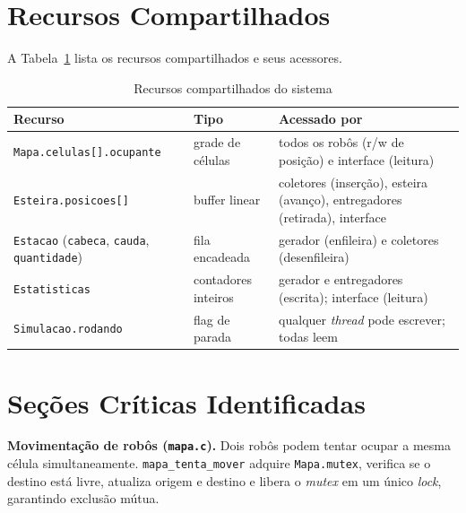 \documentclass[12pt]{article}
\begin{document}
\section{Recursos Compartilhados}
\label{sec:recursos}

A Tabela~\ref{tab:recursos} lista os recursos compartilhados e seus acessores.

\begin{table}[ht]
\centering
\caption{Recursos compartilhados do sistema}
\label{tab:recursos}
\footnotesize
\begin{tabular}{>{\raggedright\arraybackslash}p{4.1cm}
                >{\raggedright\arraybackslash}p{2.4cm}
                >{\raggedright\arraybackslash}p{6.6cm}}
\toprule
\textbf{Recurso} & \textbf{Tipo} & \textbf{Acessado por} \\
\midrule
\texttt{Mapa.celulas[]}\allowbreak\texttt{.ocupante} &
  grade de células &
  todos os robôs (r/w de posição) e interface (leitura) \\
\addlinespace
\texttt{Esteira.posicoes[]} &
  buffer linear &
  coletores (inserção), esteira (avanço), entregadores (retirada), interface \\
\addlinespace
\texttt{Estacao} (\texttt{cabeca}, \texttt{cauda}, \texttt{quantidade}) &
  fila encadeada &
  gerador (enfileira) e coletores (desenfileira) \\
\addlinespace
\texttt{Estatisticas} &
  contadores inteiros &
  gerador e entregadores (escrita); interface (leitura) \\
\addlinespace
\texttt{Simulacao.rodando} &
  flag de parada &
  qualquer \textit{thread} pode escrever; todas leem \\
\bottomrule
\end{tabular}
\end{table}

\section{Seções Críticas Identificadas}
\label{sec:criticas}

\textbf{Movimentação de robôs (\texttt{mapa.c}).}
Dois robôs podem tentar ocupar a mesma célula simultaneamente.
\texttt{mapa\_tenta\_mover} adquire \texttt{Mapa.mutex}, verifica se o destino
está livre, atualiza origem e destino e libera o \textit{mutex} em um único
\textit{lock}, garantindo exclusão mútua.
\end{document}
